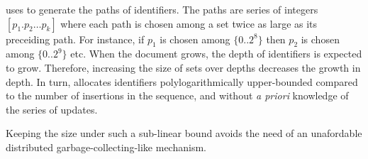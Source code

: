 \CRATE uses \LSEQ to generate the paths of identifiers. The paths are series of
integers $[p_1.p_2\ldots p_k]$ where each path is chosen among a set twice as
large as its preceiding path. For instance, if $p_1$ is chosen among
$\{0..2^8\}$ then $p_2$ is chosen among $\{0..2^9\}$ etc.  When the document
grows, the depth of identifiers is expected to grow. Therefore, increasing the
size of sets over depths decreases the growth in depth. In turn, \LSEQ allocates
identifiers polylogarithmically upper-bounded compared to the number of
insertions in the sequence, and without \emph{a priori} knowledge of the series
of updates.

Keeping the size under such a sub-linear bound avoids the need of an unafordable
distributed garbage-collecting-like mechanism.

